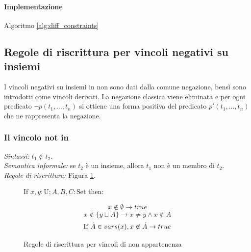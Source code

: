 \documentclass[12pt,a4paper,openright]{book} %
\begin{document}
\paragraph{Implementazione}
Algoritmo \ref{alg:diff_constraints}

\subsection{Regole di riscrittura per vincoli negativi su insiemi}
\label{subsec:clpbasedlang_lset_rewriteneg}

I vincoli negativi su insiemi in \lset{} non sono dati dalla comune
negazione, bensì sono introdotti come vincoli derivati. La negazione
classica viene eliminata e per ogni predicato $\neg p(t_1, \ldots,
t_n)$ si ottiene una forma positiva del predicato $p'(t_1, \ldots,
t_n)$ che ne rappresenta la negazione.

\subsubsection{Il vincolo not in}

\textit{Sintassi:} $t_1 \not\in t_2$.\\
\noindent\textit{Semantica informale:} se $t_2$ è un insieme, allora $t_1$ non è un membro di $t_2$.\\
\noindent\textit{Regole di riscrittura:} Figura \ref{fig:notin_constraints}.

\begin{figure}
	\begin{tcolorbox}[colframe=black, colback=white, sharp corners]
		\setcounter{equation}{3}
		\renewcommand{\theequation}{$\in$\textsubscript{\arabic{equation}}}

		If $x, y: \text{U}; A, B, C: \text{Set}$ then:

		\begin{equation}
		x \not\in \emptyset \to true
		\end{equation}
		\begin{equation}
		x \not\in \{ y \sqcup A \} \to x \neq y \land x \not\in A
		\end{equation}
		\begin{equation}
		\text{If } \dot{A} \in vars(x), x \not\in \dot{A} \to true
		\end{equation}

	\end{tcolorbox}

	\caption{Regole di riscrittura per vincoli di non appartenenza}
	\label{fig:notin_constraints}
\end{figure}
\end{document}
